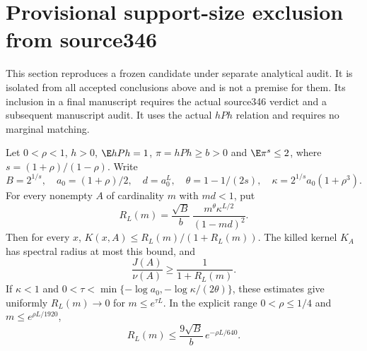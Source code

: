 \section{Provisional support-size exclusion from source346}
This section reproduces a frozen candidate under separate analytical audit. It is isolated from all accepted conclusions above and is not a premise for them. Its inclusion in a final manuscript requires the actual source346 verdict and a subsequent manuscript audit. It uses the actual $hPh$ relation and requires no marginal matching.

\begin{theorem}\label{support346}
Let $0<\rho<1$, $h>0$, $\E hPh=1$, $\pi=hPh\geq b>0$ and $\E\pi^s\leq2$, where $s=(1+\rho)/(1-\rho)$. Write
\[
 B=2^{1/s},\quad a_0=(1+\rho)/2,\quad d=a_0^L,\quad
 \theta=1-1/(2s),\quad \kappa=2^{1/s}a_0(1+\rho^3).
\]
For every nonempty $A$ of cardinality $m$ with $md<1$, put
\[
 R_L(m)=\frac{\sqrt B}{b}\,
 \frac{m^\theta\kappa^{L/2}}{(1-md)^2}.
\]
Then for every $x$, $K(x,A)\leq R_L(m)/(1+R_L(m))$. The killed kernel $K_A$ has spectral radius at most this bound, and
\[
 \frac{J(A)}{\nu(A)}\geq\frac1{1+R_L(m)}.
\]
If $\kappa<1$ and $0<\tau<\min\{-\log a_0,-\log\kappa/(2\theta)\}$, these estimates give uniformly $R_L(m)\to0$ for $m\leq e^{\tau L}$. In the explicit range $0<\rho\leq1/4$ and $m\leq e^{\rho L/1920}$,
\[
 R_L(m)\leq\frac{9\sqrt B}{b}\,e^{-\rho L/640}.
\]
\end{theorem}
